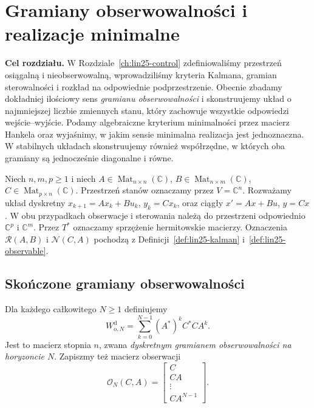 \chapter{Gramiany obserwowalności i realizacje minimalne}
\label{ch:lin27-realizations}

\noindent\textbf{Cel rozdziału.}
W Rozdziale~\ref{ch:lin25-control}
zdefiniowaliśmy przestrzeń osiągalną
i nieobserwowalną, wprowadziliśmy
kryteria Kalmana, gramian sterowalności
i rozkład na odpowiednie podprzestrzenie.
Obecnie zbadamy dokładniej ilościowy
sens \emph{gramianu obserwowalności}
i skonstruujemy układ o najmniejszej
liczbie zmiennych stanu, który zachowuje
wszystkie odpowiedzi wejście--wyjście.
Podamy algebraiczne kryterium
minimalności przez macierz Hankela
oraz wyjaśnimy, w jakim sensie
minimalna realizacja jest jednoznaczna.
W stabilnych układach skonstruujemy
również współrzędne, w których
oba gramiany są jednocześnie diagonalne
i równe.

Niech \(n,m,p\ge1\) i niech
\(A\in\operatorname{Mat}_{n\times n}(\mathbb C)\),
\(B\in\operatorname{Mat}_{n\times m}(\mathbb C)\),
\(C\in\operatorname{Mat}_{p\times n}(\mathbb C)\).
Przestrzeń stanów oznaczamy
przez \(V=\mathbb C^n\).
Rozważamy układ dyskretny
\(x_{k+1}=Ax_k+Bu_k\), \(y_k=Cx_k\),
oraz ciągły
\(x'=Ax+Bu\), \(y=Cx\).
W obu przypadkach
obserwacje i sterowania
należą do przestrzeni
odpowiednio \(\mathbb C^p\)
i \(\mathbb C^m\).
Przez \(T^*\) oznaczamy
sprzężenie hermitowskie macierzy.
Oznaczenia
\(\mathcal R(A,B)\)
i \(\mathcal N(C,A)\)
pochodzą z
Definicji~\ref{def:lin25-kalman}
i~\ref{def:lin25-observable}.

\section{Skończone gramiany obserwowalności}
\label{sec:lin27-finite}

\begin{definicja}
\label{def:lin27-obs-discrete}
Dla każdego całkowitego \(N\ge1\)
definiujemy
\[
 W_{\mathrm o,N}^{\mathrm d}
 =\sum_{k=0}^{N-1}(A^*)^kC^*CA^k.
\]
Jest to macierz stopnia \(n\),
zwana \emph{dyskretnym gramianem
obserwowalności na horyzoncie \(N\)}.
Zapiszmy też macierz obserwacji
\[
 \mathcal O_N(C,A)
 =\begin{bmatrix}
     C\\CA\\\vdots\\CA^{N-1}
   \end{bmatrix}.
\]
\end{definicja}

